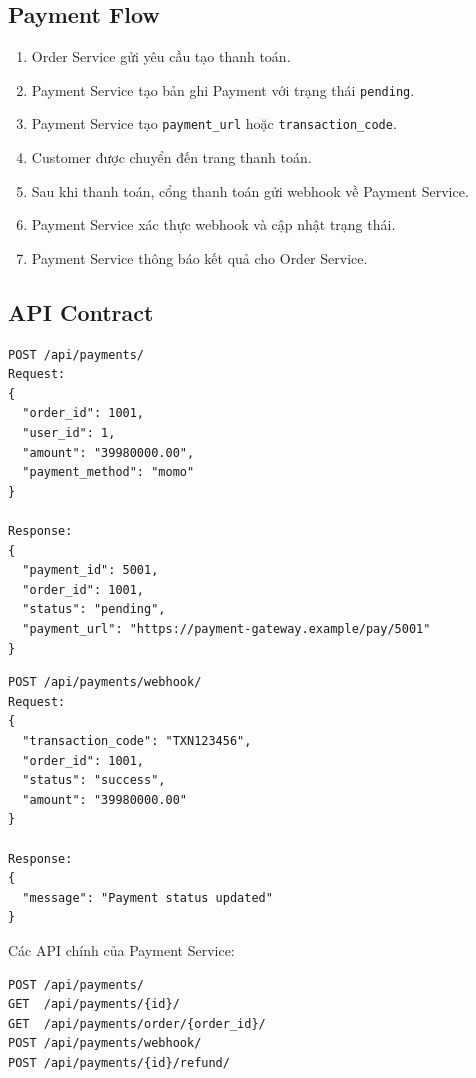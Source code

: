 \subsection{Payment Flow}

\begin{enumerate}
  \item Order Service gửi yêu cầu tạo thanh toán.
  \item Payment Service tạo bản ghi Payment với trạng thái \texttt{pending}.
  \item Payment Service tạo \texttt{payment\_url} hoặc \texttt{transaction\_code}.
  \item Customer được chuyển đến trang thanh toán.
  \item Sau khi thanh toán, cổng thanh toán gửi webhook về Payment Service.
  \item Payment Service xác thực webhook và cập nhật trạng thái.
  \item Payment Service thông báo kết quả cho Order Service.
\end{enumerate}

\subsection{API Contract}

\begin{lstlisting}[style=code]
POST /api/payments/
Request:
{
  "order_id": 1001,
  "user_id": 1,
  "amount": "39980000.00",
  "payment_method": "momo"
}

Response:
{
  "payment_id": 5001,
  "order_id": 1001,
  "status": "pending",
  "payment_url": "https://payment-gateway.example/pay/5001"
}
\end{lstlisting}

\begin{lstlisting}[style=code]
POST /api/payments/webhook/
Request:
{
  "transaction_code": "TXN123456",
  "order_id": 1001,
  "status": "success",
  "amount": "39980000.00"
}

Response:
{
  "message": "Payment status updated"
}
\end{lstlisting}

Các API chính của Payment Service:

\begin{lstlisting}[style=code]
POST /api/payments/
GET  /api/payments/{id}/
GET  /api/payments/order/{order_id}/
POST /api/payments/webhook/
POST /api/payments/{id}/refund/
\end{lstlisting}

